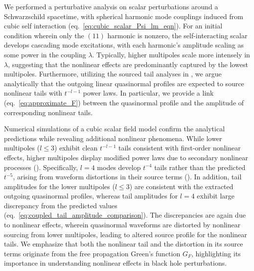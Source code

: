 We performed a perturbative analysis on scalar perturbations around a Schwarzschild spacetime, with spherical harmonic mode couplings induced from cubic self interaction (eq.~\eqref{eq:cubic_scalar_Psi_lm_eqn}).
For an initial condition wherein only the $(11)$ harmonic is nonzero, the self-interacting scalar develops cascading mode excitations, with each harmonic's amplitude scaling as some power in the coupling $\lambda$.
Typically, higher multipoles scale more intensely in $\lambda$, suggesting that the nonlinear effects are predominantly captured by the lowest multipoles.
Furthermore, utilizing the sourced tail analyses in , we argue analytically that the outgoing linear quasinormal profiles are expected to source nonlinear tails with $t^{-l-1}$ power laws.
In particular, we provide a link (eq.~\eqref{eq:approximate_F}) between the quasinormal profile and the amplitude of corresponding nonlinear tails.



Numerical simulations of a cubic scalar field model confirm the analytical predictions while revealing additional nonlinear phenomena.
While lower multipoles ($l \leq 3$) exhibit clean $t^{-l-1}$ tails consistent with first-order nonlinear effects, higher multipoles display modified power laws due to secondary nonlinear processes ().
Specifically, $l=4$ modes develop $t^{-4}$ tails rather than the predicted $t^{-5}$, arising from waveform distortions in their source terms ().
In addition, tail amplitudes for the lower multipoles ($l \leq 3$) are consistent with the extracted outgoing quasinormal profiles, whereas tail amplitudes for $l=4$ exhibit large discrepancy from the predicted values (eq.~\eqref{eq:coupled_tail_amplitude_comparison}).
The discrepancies are again due to nonlinear effects, wherein quasinormal waveforms are distorted by nonlinear sourcing from lower multipoles, leading to altered source profile for the nonlinear tails.
We emphasize that both the nonlinear tail and the distortion in its source terms originate from the free propagation Green's function $G_F$, highlighting its importance in understanding nonlinear effects in black hole perturbations.




